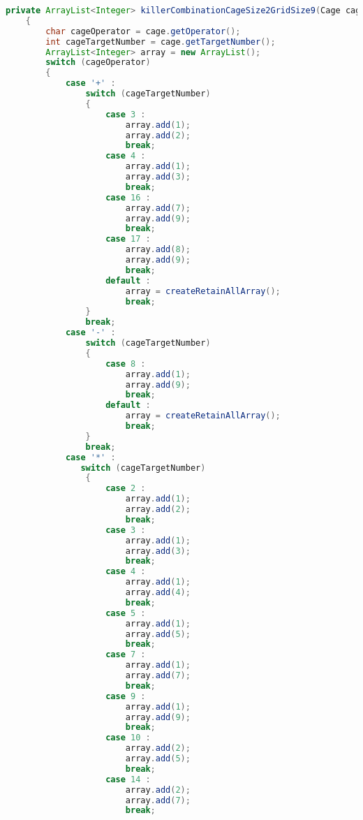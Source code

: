 \begin{lstlisting}[language=Java,basicstyle=\tiny,caption=SolverRuleBased.java]
    private ArrayList<Integer> killerCombinationCageSize2GridSize9(Cage cage)
    {
        char cageOperator = cage.getOperator();
        int cageTargetNumber = cage.getTargetNumber();
        ArrayList<Integer> array = new ArrayList();
        switch (cageOperator)
        {
            case '+' :
                switch (cageTargetNumber)
                {
                    case 3 :
                        array.add(1);
                        array.add(2);
                        break;
                    case 4 :  
                        array.add(1);
                        array.add(3);
                        break;
                    case 16 :
                        array.add(7);
                        array.add(9);
                        break;
                    case 17 :
                        array.add(8);
                        array.add(9);
                        break;
                    default :
                        array = createRetainAllArray();
                        break;
                }
                break;
            case '-' :
                switch (cageTargetNumber)
                {
                    case 8 :
                        array.add(1);
                        array.add(9);
                        break;
                    default :
                        array = createRetainAllArray();
                        break;
                }
                break;
            case '*' :
               switch (cageTargetNumber)
                {
                    case 2 :
                        array.add(1);
                        array.add(2);
                        break;
                    case 3 :
                        array.add(1);
                        array.add(3);
                        break;
                    case 4 :
                        array.add(1);
                        array.add(4);
                        break;
                    case 5 :
                        array.add(1);
                        array.add(5);
                        break;
                    case 7 :
                        array.add(1);
                        array.add(7);
                        break;
                    case 9 :
                        array.add(1);
                        array.add(9);
                        break;
                    case 10 :
                        array.add(2);
                        array.add(5);
                        break;
                    case 14 :
                        array.add(2);
                        array.add(7);
                        break;

\end{lstlisting}

